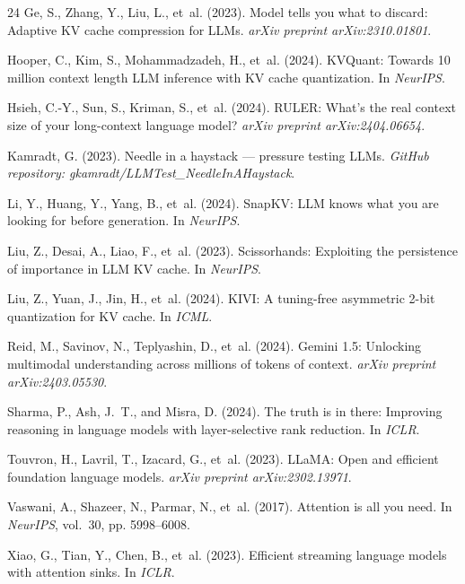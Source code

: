 \documentclass{article}
\theoremstyle{definition}
\begin{document}
\begin{thebibliography}{24}
 Ge, S., Zhang, Y., Liu, L., et~al. (2023). Model tells you what to discard: Adaptive KV cache compression for LLMs. \textit{arXiv preprint arXiv:2310.01801}.

 Hooper, C., Kim, S., Mohammadzadeh, H., et~al. (2024). KVQuant: Towards 10 million context length LLM inference with KV cache quantization. In \textit{NeurIPS}.

 Hsieh, C.-Y., Sun, S., Kriman, S., et~al. (2024). RULER: What's the real context size of your long-context language model? \textit{arXiv preprint arXiv:2404.06654}.

 Kamradt, G. (2023). Needle in a haystack --- pressure testing LLMs. \textit{GitHub repository: gkamradt/LLMTest\_NeedleInAHaystack}.

 Li, Y., Huang, Y., Yang, B., et~al. (2024). SnapKV: LLM knows what you are looking for before generation. In \textit{NeurIPS}.

 Liu, Z., Desai, A., Liao, F., et~al. (2023). Scissorhands: Exploiting the persistence of importance in LLM KV cache. In \textit{NeurIPS}.

 Liu, Z., Yuan, J., Jin, H., et~al. (2024). KIVI: A tuning-free asymmetric 2-bit quantization for KV cache. In \textit{ICML}.

 Reid, M., Savinov, N., Teplyashin, D., et~al. (2024). Gemini 1.5: Unlocking multimodal understanding across millions of tokens of context. \textit{arXiv preprint arXiv:2403.05530}.

 Sharma, P., Ash, J.~T., and Misra, D. (2024). The truth is in there: Improving reasoning in language models with layer-selective rank reduction. In \textit{ICLR}.

 Touvron, H., Lavril, T., Izacard, G., et~al. (2023). LLaMA: Open and efficient foundation language models. \textit{arXiv preprint arXiv:2302.13971}.

 Vaswani, A., Shazeer, N., Parmar, N., et~al. (2017). Attention is all you need. In \textit{NeurIPS}, vol.~30, pp. 5998--6008.

 Xiao, G., Tian, Y., Chen, B., et~al. (2023). Efficient streaming language models with attention sinks. In \textit{ICLR}.


\end{thebibliography}
\end{document}
